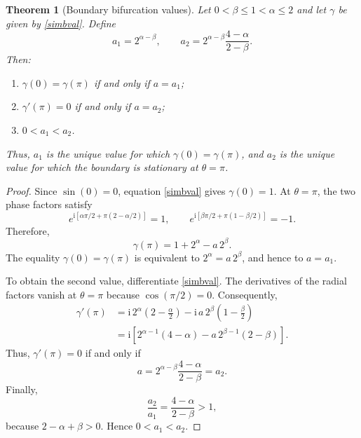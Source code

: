 \documentclass[10pt,a4paper]{amsart}
\newtheorem{thm}{Theorem}
\begin{document}
\begin{thm}[Boundary bifurcation values]\label{thm:bifurcation-values}
Let $0 < \beta \leq 1 < \alpha \leq 2$ and let $\gamma$ be given by \eqref{simbval}. Define
\begin{equation}\label{a1a2}
a_1=2^{\alpha-\beta},
\qquad
a_2=2^{\alpha-\beta}\frac{4-\alpha}{2-\beta}.
\end{equation}
Then:
\begin{enumerate}
\item $\gamma(0)=\gamma(\pi)$ if and only if $a=a_1$;
\item $\gamma'(\pi)=0$ if and only if $a=a_2$;
\item $0<a_1<a_2$.
\end{enumerate}
Thus, $a_1$ is the unique value for which $\gamma(0)=\gamma(\pi)$, and $a_2$ is the unique value for which the boundary is stationary at $\theta=\pi$.
\end{thm}

\begin{proof}
Since $\sin(0)=0$, equation \eqref{simbval} gives $\gamma(0)=1$. At $\theta=\pi$, the two phase factors satisfy
\begin{equation*}
e^{\mathrm{i}[\alpha\pi/2+\pi(2-\alpha/2)]}=1,
\qquad
e^{\mathrm{i}[\beta\pi/2+\pi(1-\beta/2)]}=-1.
\end{equation*}
Therefore,
\begin{equation*}
\gamma(\pi)=1+2^\alpha-a\,2^\beta.
\end{equation*}
The equality $\gamma(0)=\gamma(\pi)$ is equivalent to $2^\alpha=a\,2^\beta$, and hence to $a=a_1$.

To obtain the second value, differentiate \eqref{simbval}. The derivatives of the radial factors vanish at $\theta=\pi$ because $\cos(\pi/2)=0$. Consequently,
\begin{align*}
\gamma'(\pi)
&=\mathrm{i}\,2^\alpha\left(2-\frac{\alpha}{2}\right)
-\mathrm{i}\,a\,2^\beta\left(1-\frac{\beta}{2}\right)\\
&=\mathrm{i}\left[2^{\alpha-1}(4-\alpha)
-a\,2^{\beta-1}(2-\beta)\right].
\end{align*}
Thus, $\gamma'(\pi)=0$ if and only if
\begin{equation*}
a=2^{\alpha-\beta}\frac{4-\alpha}{2-\beta}=a_2.
\end{equation*}
Finally,
\begin{equation*}
\frac{a_2}{a_1}=\frac{4-\alpha}{2-\beta}>1,
\end{equation*}
because $2-\alpha+\beta>0$. Hence $0<a_1<a_2$.
\end{proof}
\end{document}
